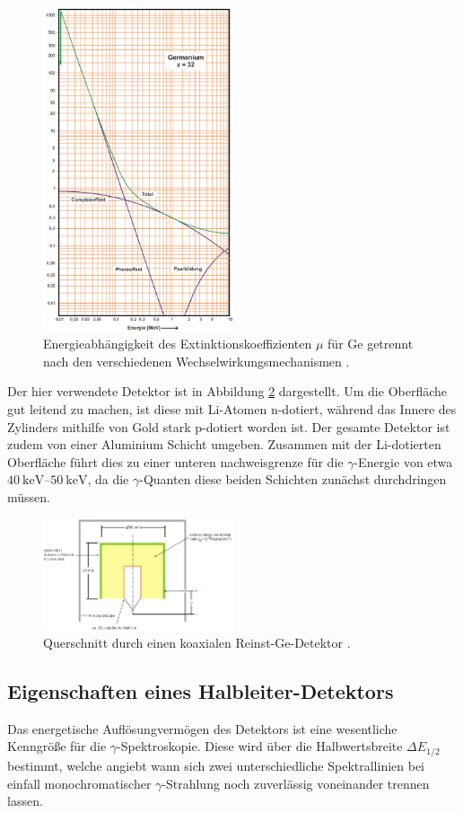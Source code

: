 \begin{figure}
	\centering
	\includegraphics[width = 0.5\textwidth]{pic/german.png}
	\caption{Energieabhängigkeit des Extinktionskoeffizienten $\mu$ für Ge getrennt nach den verschiedenen Wechselwirkungsmechanismen \cite{anleitung}.}
	\label{german}
\end{figure}

Der hier verwendete Detektor ist in Abbildung \ref{detekt} dargestellt.
Um die Oberfläche gut leitend zu machen, ist diese mit Li-Atomen n-dotiert, während das Innere des Zylinders mithilfe von Gold stark p-dotiert worden ist.
Der gesamte Detektor ist zudem von einer Aluminium Schicht umgeben.
Zusammen mit der Li-dotierten Oberfläche führt dies zu einer unteren nachweisgrenze für die $\gamma$-Energie von etwa $\SIrange{40}{50}{\kilo\electronvolt}$, da die $\gamma$-Quanten diese beiden Schichten zunächst durchdringen müssen.

\begin{figure}
	\centering
	\includegraphics[width = 0.5\textwidth]{pic/detekt.png}
	\caption{Querschnitt durch einen koaxialen Reinst-Ge-Detektor \cite{anleitung}.}
	\label{detekt}
\end{figure}

\FloatBarrier
\subsection{Eigenschaften eines Halbleiter-Detektors} %
\label{sec:eigenschaften_eines_halbleiter_detektors}

Das energetische Auflösungvermögen des Detektors ist eine wesentliche Kenngröße für die $\gamma$-Spektroskopie.
Diese wird über die Halbwertsbreite $\Delta E_\text{1/2}$ bestimmt, welche angiebt wann sich zwei unterschiedliche Spektrallinien bei einfall monochromatischer $\gamma$-Strahlung noch zuverlässig voneinander trennen lassen.
